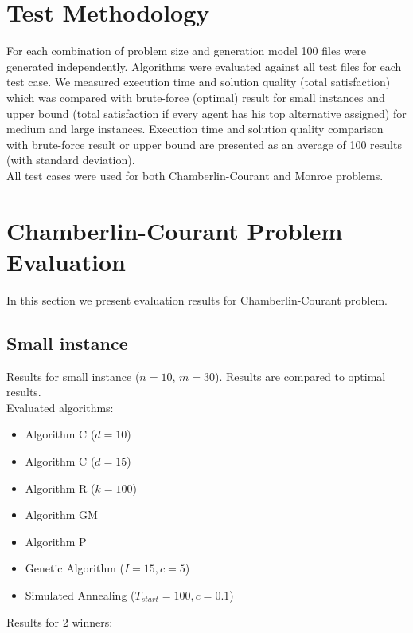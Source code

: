 \section{Test Methodology}

For each combination of problem size and generation model 100 files were generated independently. Algorithms were evaluated against all test files for each test case. We measured execution time and solution quality (total satisfaction) which was compared with brute-force (optimal) result for small instances and upper bound (total satisfaction if every agent has his top alternative assigned) for medium and large instances. Execution time and solution quality comparison with brute-force result or upper bound are presented as an average of 100 results (with standard deviation).
\\

All test cases were used for both Chamberlin-Courant and Monroe problems.

\section{Chamberlin-Courant Problem Evaluation}

In this section we present evaluation results for Chamberlin-Courant problem.

\subsection{Small instance}

Results for small instance ($n = 10$, $m = 30$). Results are compared to optimal results.
\\

Evaluated algorithms:
\begin{itemize}
	\item Algorithm C ($d = 10$)
	\item Algorithm C ($d = 15$)
	\item Algorithm R ($k = 100$)
	\item Algorithm GM
	\item Algorithm P
	\item Genetic Algorithm ($I = 15, c = 5$)
	\item Simulated Annealing ($T_{start} = 100, c = 0.1$)
\end{itemize}

Results for 2 winners:
\\

